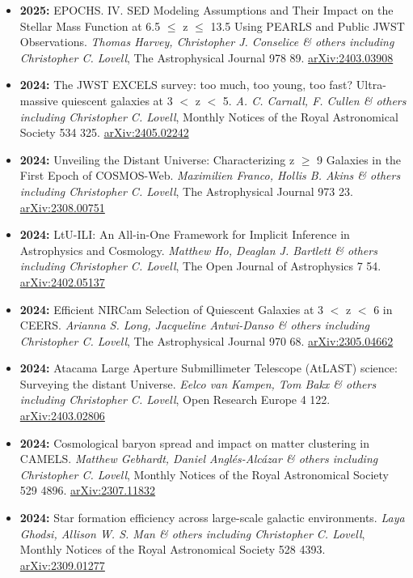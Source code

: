 \begin{itemize}
\item \textbf{2025:} EPOCHS. IV. SED Modeling Assumptions and Their Impact on the Stellar Mass Function at 6.5 $\leq$ z $\leq$ 13.5 Using PEARLS and Public JWST Observations. \textit{Thomas Harvey, Christopher J. Conselice \& others including Christopher C. Lovell}, The Astrophysical Journal 978 89. \href{https://arxiv.org/abs/2403.03908}{arXiv:2403.03908}
\item \textbf{2024:} The JWST EXCELS survey: too much, too young, too fast? Ultra-massive quiescent galaxies at 3 $<$ z $<$ 5. \textit{A. C. Carnall, F. Cullen \& others including Christopher C. Lovell}, Monthly Notices of the Royal Astronomical Society 534 325. \href{https://arxiv.org/abs/2405.02242}{arXiv:2405.02242}
\item \textbf{2024:} Unveiling the Distant Universe: Characterizing z $\geq$ 9 Galaxies in the First Epoch of COSMOS-Web. \textit{Maximilien Franco, Hollis B. Akins \& others including Christopher C. Lovell}, The Astrophysical Journal 973 23. \href{https://arxiv.org/abs/2308.00751}{arXiv:2308.00751}
\item \textbf{2024:} LtU-ILI: An All-in-One Framework for Implicit Inference in Astrophysics and Cosmology. \textit{Matthew Ho, Deaglan J. Bartlett \& others including Christopher C. Lovell}, The Open Journal of Astrophysics 7 54. \href{https://arxiv.org/abs/2402.05137}{arXiv:2402.05137}
\item \textbf{2024:} Efficient NIRCam Selection of Quiescent Galaxies at 3 $<$ z $<$ 6 in CEERS. \textit{Arianna S. Long, Jacqueline Antwi-Danso \& others including Christopher C. Lovell}, The Astrophysical Journal 970 68. \href{https://arxiv.org/abs/2305.04662}{arXiv:2305.04662}
\item \textbf{2024:} Atacama Large Aperture Submillimeter Telescope (AtLAST) science: Surveying the distant Universe. \textit{Eelco van Kampen, Tom Bakx \& others including Christopher C. Lovell}, Open Research Europe 4 122. \href{https://arxiv.org/abs/2403.02806}{arXiv:2403.02806}
\item \textbf{2024:} Cosmological baryon spread and impact on matter clustering in CAMELS. \textit{Matthew Gebhardt, Daniel Anglés-Alcázar \& others including Christopher C. Lovell}, Monthly Notices of the Royal Astronomical Society 529 4896. \href{https://arxiv.org/abs/2307.11832}{arXiv:2307.11832}
\item \textbf{2024:} Star formation efficiency across large-scale galactic environments. \textit{Laya Ghodsi, Allison W. S. Man \& others including Christopher C. Lovell}, Monthly Notices of the Royal Astronomical Society 528 4393. \href{https://arxiv.org/abs/2309.01277}{arXiv:2309.01277}

\end{itemize}
